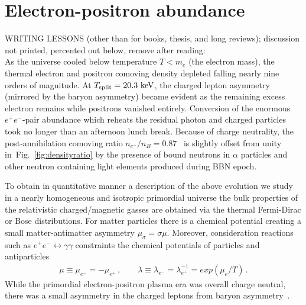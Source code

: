 \documentclass[a4paper]{article}
\newcommand*{\keV}{\text{ keV}}
\newcommand{\rf}[1]{Fig.~{\ref{#1}}}
\begin{document}
\section{Electron-positron abundance}
\label{sec:abundance}
\noindent 
WRITING LESSONS (other than for books, thesis, and long reviews); discussion not printed, percented out below, remove after reading:\\
% 
As the universe cooled below temperature $T<m_{e}$ (the electron mass), the thermal electron and positron comoving density depleted  falling nearly nine orders of magnitude. At $T_{\rm split}=20.3\keV$, the charged lepton asymmetry (mirrored by the baryon asymmetry) became evident as the remaining excess electron remains while positrons vanished entirely. Conversion of the enormous $e^+e^-$-pair abundance which reheats the residual photon and charged particles took no longer than an afternoon lunch break. Because of charge neutrality, the post-annihilation comoving ratio $n_{e^{-}}/n_{B}=0.87$~\cite{rafelski2023short} is slightly offset from unity in~\rf{fig:densityratio} by the presence of bound neutrons in $\alpha$ particles and  other neutron containing light elements produced during BBN epoch. 

To obtain in quantitative manner a description of the above evolution we study in a  nearly homogeneous and isotropic primordial universe  the bulk properties of the relativistic charged/magnetic gasses are obtained via the thermal Fermi-Dirac or Bose distributions.  For matter particles there is a chemical potential creating a small matter-antimatter asymmetry $\mu_{\sigma}=\sigma\mu$. Moreover, consideration  reactions such as $e^+e^-\leftrightarrow \gamma\gamma$ constraints the chemical potentials of particles and antiparticles~\cite{elze1980relativistic} 
\begin{align}
    \label{cpotential}
    \mu\equiv\mu_{e^{-}}=-\mu_{e^{+}}\,,\qquad
    \lambda\equiv\lambda_{e^{-}}=\lambda_{e^{+}}^{-1}=exp(\mu_e/T)\,.
\end{align}
While the primordial electron-positron plasma era was overall charge neutral, there was a small asymmetry in the charged leptons from baryon asymmetry~\cite{fromerth2012quarkgluon,canetti2012matter}. 
\end{document}
